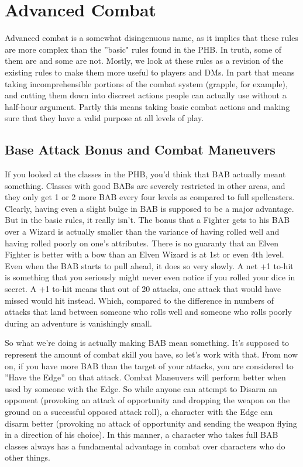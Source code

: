 
\section{Advanced Combat}

Advanced combat is a somewhat disingenuous name, as it implies that these rules are more complex than the ''basic" rules found in the PHB. In truth, some of them are and some are not. Mostly, we look at these rules as a revision of the existing rules to make them more useful to players and DMs. In part that means taking incomprehensible portions of the combat system (grapple, for example), and cutting them down into discreet actions people can actually use without a half-hour argument. Partly this means taking basic combat actions and making sure that they have a valid purpose at all levels of play.

\subsection{Base Attack Bonus and Combat Maneuvers}

If you looked at the classes in the PHB, you'd think that BAB actually meant something. Classes with good BABs are severely restricted in other areas, and they only get 1 or 2 more BAB every four levels as compared to full spellcasters. Clearly, having even a slight bulge in BAB is supposed to be a major advantage. But in the basic rules, it really isn't. The bonus that a Fighter gets to his BAB over a Wizard is actually smaller than the variance of having rolled well and having rolled poorly on one's attributes. There is no guaranty that an Elven Fighter is better with a bow than an Elven Wizard is at 1st or even 4th level. Even when the BAB starts to pull ahead, it does so very slowly. A net +1 to-hit is something that you seriously might never even notice if you rolled your dice in secret. A +1 to-hit means that out of 20 attacks, one attack that would have missed would hit instead. Which, compared to the difference in numbers of attacks that land between someone who rolls well and someone who rolls poorly during an adventure is vanishingly small.

So what we're doing is actually making BAB mean something. It's supposed to represent the amount of combat skill you have, so let's work with that. From now on, if you have more BAB than the target of your attacks, you are considered to ''Have the Edge'' on that attack. Combat Maneuvers will perform better when used by someone with the Edge. So while anyone can attempt to Disarm an opponent (provoking an attack of opportunity and dropping the weapon on the ground on a successful opposed attack roll), a character with the Edge can disarm better (provoking no attack of opportunity and sending the weapon flying in a direction of his choice). In this manner, a character who takes full BAB classes always has a fundamental advantage in combat over characters who do other things.

